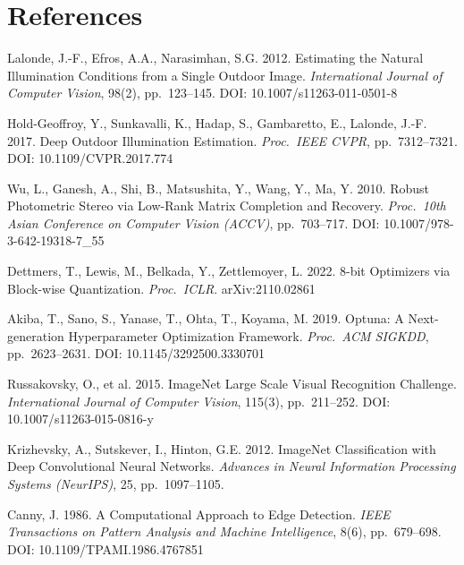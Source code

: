 \documentclass[9pt, a4paper, twocolumn]{article}
\begin{document}
\section*{References}
\begin{sloppypar}
\begin{enumerate}[label={[\arabic*]}, leftmargin=*, itemsep=2pt, parsep=0pt, font=\small]

\item Lalonde, J.-F., Efros, A.A., Narasimhan, S.G. 2012. Estimating the Natural Illumination Conditions from a Single Outdoor Image. \textit{International Journal of Computer Vision}, 98(2), pp.~123--145. DOI: 10.1007/s11263-011-0501-8

\item Hold-Geoffroy, Y., Sunkavalli, K., Hadap, S., Gambaretto, E., Lalonde, J.-F. 2017. Deep Outdoor Illumination Estimation. \textit{Proc.\ IEEE CVPR}, pp.~7312--7321. DOI: 10.1109/CVPR.2017.774

\item Wu, L., Ganesh, A., Shi, B., Matsushita, Y., Wang, Y., Ma, Y. 2010. Robust Photometric Stereo via Low-Rank Matrix Completion and Recovery. \textit{Proc.\ 10th Asian Conference on Computer Vision (ACCV)}, pp.~703--717. DOI: 10.1007/978-3-642-19318-7\_55

\item Dettmers, T., Lewis, M., Belkada, Y., Zettlemoyer, L. 2022. 8-bit Optimizers via Block-wise Quantization. \textit{Proc.\ ICLR}. arXiv:2110.02861

\item Akiba, T., Sano, S., Yanase, T., Ohta, T., Koyama, M. 2019. Optuna: A Next-generation Hyperparameter Optimization Framework. \textit{Proc.\ ACM SIGKDD}, pp.~2623--2631. DOI: 10.1145/3292500.3330701

\item Russakovsky, O., et al. 2015. ImageNet Large Scale Visual Recognition Challenge. \textit{International Journal of Computer Vision}, 115(3), pp.~211--252. DOI: 10.1007/s11263-015-0816-y

\item Krizhevsky, A., Sutskever, I., Hinton, G.E. 2012. ImageNet Classification with Deep Convolutional Neural Networks. \textit{Advances in Neural Information Processing Systems (NeurIPS)}, 25, pp.~1097--1105.

\item Canny, J. 1986. A Computational Approach to Edge Detection. \textit{IEEE Transactions on Pattern Analysis and Machine Intelligence}, 8(6), pp.~679--698. DOI: 10.1109/TPAMI.1986.4767851


\end{enumerate}
\end{sloppypar}
\end{document}
